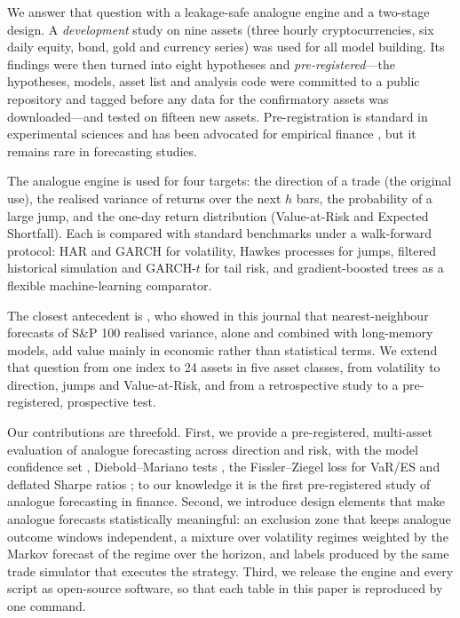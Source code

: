 \documentclass[preprint,12pt,authoryear]{elsarticle}
\begin{document}
We answer that question with a leakage-safe analogue engine and a two-stage design. A
\emph{development} study on nine assets (three hourly cryptocurrencies, six daily equity, bond,
gold and currency series) was used for all model building. Its findings were then turned into
eight hypotheses and \emph{pre-registered}---the hypotheses, models, asset list and analysis code
were committed to a public repository and tagged before any data for the confirmatory assets was
downloaded---and tested on fifteen new assets. Pre-registration is standard in experimental
sciences \citep{nosek2018} and has been advocated for empirical finance \citep{harvey2017}, but it
remains rare in forecasting studies.

The analogue engine is used for four targets: the direction of a trade (the original use), the
realised variance of returns over the next $h$ bars, the probability of a large jump, and the
one-day return distribution (Value-at-Risk and Expected Shortfall). Each is compared with
standard benchmarks under a walk-forward protocol: HAR \citep{corsi2009} and GARCH
\citep{bollerslev1986} for volatility, Hawkes processes \citep{hawkes1971} for jumps, filtered
historical simulation \citep{baroneadesi1999} and GARCH-$t$ for tail risk, and gradient-boosted
trees \citep{friedman2001} as a flexible machine-learning comparator.

The closest antecedent is \citet{andrada2016}, who showed in this journal that nearest-neighbour
forecasts of S\&P 100 realised variance, alone and combined with long-memory models, add value
mainly in economic rather than statistical terms. We extend that question from one index to 24
assets in five asset classes, from volatility to direction, jumps and Value-at-Risk, and from a
retrospective study to a pre-registered, prospective test.

Our contributions are threefold. First, we provide a pre-registered, multi-asset evaluation of
analogue forecasting across direction and risk, with the model confidence set
\citep{hansen2011}, Diebold--Mariano tests \citep{diebold1995}, the Fissler--Ziegel loss for
VaR/ES \citep{fissler2016,patton2019} and deflated Sharpe ratios \citep{bailey2014}; to our
knowledge it is the first pre-registered study of analogue forecasting in finance. Second, we
introduce design elements that make analogue forecasts statistically meaningful: an exclusion
zone that keeps analogue outcome windows independent, a mixture over volatility regimes weighted
by the Markov forecast of the regime over the horizon, and labels produced by the same trade
simulator that executes the strategy. Third, we release the engine and every script as
open-source software, so that each table in this paper is reproduced by one command.
\end{document}
